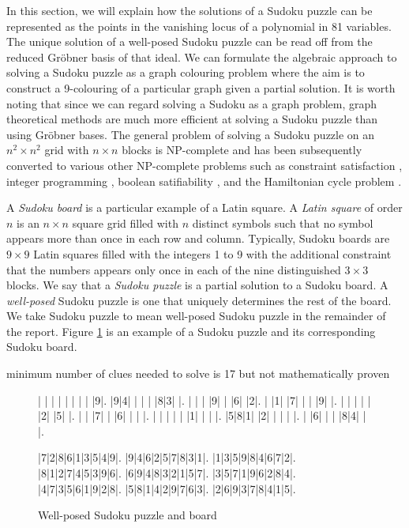 \documentclass[../main.tex]{subfiles}
\begin{document}
    
    
    In this section, we will explain how the solutions of a Sudoku puzzle can be represented as the points in the vanishing locus of a polynomial in 81 variables. The unique solution of a well-posed Sudoku puzzle can be read off from the reduced Gr\"obner basis of that ideal. We can formulate the algebraic approach to solving a Sudoku puzzle as a graph colouring problem where the aim is to construct a 9-colouring of a particular graph given a partial solution. It is worth noting that since we can regard solving a Sudoku as a graph problem, graph theoretical methods are much more efficient at solving a Sudoku puzzle than using Gr\"obner bases. The general problem of solving a Sudoku puzzle on an $n^2\times n^2$ grid with $n\times n$ blocks is NP-complete and has been subsequently converted to various other NP-complete problems such as constraint satisfaction \citep{simonis2005sudoku}, integer programming \citep{bartlett2008integer}, boolean satifiability \citep{ist2006sudoku}, and the Hamiltonian cycle problem \citep{haythorpe2016reducing}.

    A \emph{Sudoku board} is a particular example of a Latin square. A \emph{Latin square} of order $n$ is an $n\times n$ square grid filled with $n$ distinct symbols such that no symbol appears more than once in each row and column. Typically, Sudoku boards are $9\times 9$ Latin squares filled with the integers 1 to 9 with the additional constraint that the numbers appears only once in each of the nine distinguished $3\times 3$ blocks. We say that a \emph{Sudoku puzzle} is a partial solution to a Sudoku board. A \emph{well-posed} Sudoku puzzle is one that uniquely determines the rest of the board. We take Sudoku puzzle to mean well-posed Sudoku puzzle in the remainder of the report. Figure \ref{board} is an example of a Sudoku puzzle and its corresponding Sudoku board.

    minimum number of clues needed to solve is 17 but not mathematically proven


    \begin{figure}[h!]
        \centering
        \begin{sudoku-block}
            | | | | | | | | |9|.
            |9|4| | | | |8|3| |.
            | | | |9| | |6| |2|.
            | |1| |7| | | |9| |.
            | | | | | |2| |5| |.
            | | |7| | |6| | | |.
            | | | | | |1| | | |.
            |5|8|1| |2| | | | |.
            | |6| | | |8|4| | |.
        \end{sudoku-block}
        \hspace*{10pt}
        \begin{sudoku-block}
            |7|2|8|6|1|3|5|4|9|.
            |9|4|6|2|5|7|8|3|1|.
            |1|3|5|9|8|4|6|7|2|.
            |8|1|2|7|4|5|3|9|6|.
            |6|9|4|8|3|2|1|5|7|.
            |3|5|7|1|9|6|2|8|4|.
            |4|7|3|5|6|1|9|2|8|.
            |5|8|1|4|2|9|7|6|3|.
            |2|6|9|3|7|8|4|1|5|.
        \end{sudoku-block}
        \caption{Well-posed Sudoku puzzle and board}
        \label{board}
    \end{figure}
\end{document}
